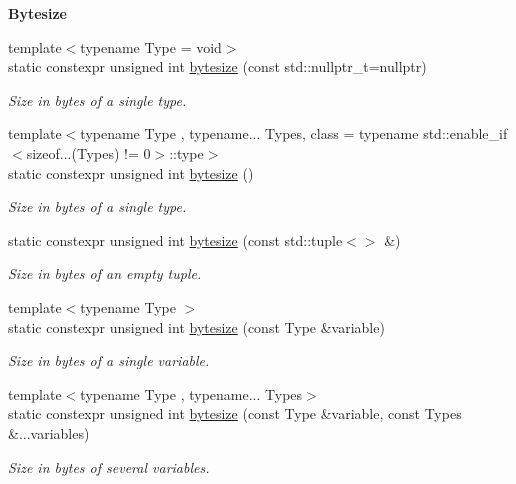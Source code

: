 \begin{Indent}{\bf Bytesize}\par
\begin{DoxyCompactItemize}
\item 
{\footnotesize template$<$typename Type  = void$>$ }\\static constexpr unsigned int \hyperlink{exceptionmagrathea_1_1DataHandler_a9453a2836ff2573bc80e11f1de0cebe2}{bytesize} (const std\-::nullptr\-\_\-t=nullptr)
\begin{DoxyCompactList}\small\item\em Size in bytes of a single type. \end{DoxyCompactList}\item 
{\footnotesize template$<$typename Type , typename... Types, class  = typename std\-::enable\-\_\-if$<$sizeof...(\-Types) != 0$>$\-::type$>$ }\\static constexpr unsigned int \hyperlink{exceptionmagrathea_1_1DataHandler_afb38de93a744c640d2642c53a01770d6}{bytesize} ()
\begin{DoxyCompactList}\small\item\em Size in bytes of a single type. \end{DoxyCompactList}\item 
static constexpr unsigned int \hyperlink{exceptionmagrathea_1_1DataHandler_a91a123543b345a2b8933a7ef121e48d7}{bytesize} (const std\-::tuple$<$$>$ \&)
\begin{DoxyCompactList}\small\item\em Size in bytes of an empty tuple. \end{DoxyCompactList}\item 
{\footnotesize template$<$typename Type $>$ }\\static constexpr unsigned int \hyperlink{exceptionmagrathea_1_1DataHandler_a005235ea08efd9713579f41791145f79}{bytesize} (const Type \&variable)
\begin{DoxyCompactList}\small\item\em Size in bytes of a single variable. \end{DoxyCompactList}\item 
{\footnotesize template$<$typename Type , typename... Types$>$ }\\static constexpr unsigned int \hyperlink{exceptionmagrathea_1_1DataHandler_aab076f5fed2b6c72e027aa4d8f9bd511}{bytesize} (const Type \&variable, const Types \&...variables)
\begin{DoxyCompactList}\small\item\em Size in bytes of several variables. \end{DoxyCompactList}\item 
$$
\end{DoxyCompactItemize}
\end{Indent}
